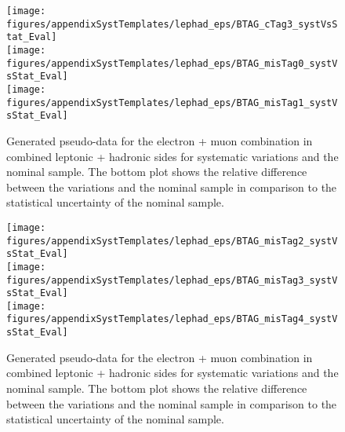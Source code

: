 \begin{figure}[!hb]
\begin{center}
        \texttt{[image: figures/appendixSystTemplates/lephad\_eps/BTAG\_cTag3\_systVsStat\_Eval]}\\
        \texttt{[image: figures/appendixSystTemplates/lephad\_eps/BTAG\_misTag0\_systVsStat\_Eval]}\\
        \texttt{[image: figures/appendixSystTemplates/lephad\_eps/BTAG\_misTag1\_systVsStat\_Eval]}
  
        \caption{Generated pseudo-data for the electron + muon combination in combined leptonic + hadronic sides for systematic variations and the nominal \ttbar sample. The bottom plot shows the relative difference between the variations and the nominal sample in comparison to the statistical uncertainty of the nominal sample.}   
        \label{fig:systematicVar_lephad_Btag_2_2}
        \end{center}                          
        \end{figure}

\begin{figure}[!hb]
\begin{center}
        \texttt{[image: figures/appendixSystTemplates/lephad\_eps/BTAG\_misTag2\_systVsStat\_Eval]}\\
        \texttt{[image: figures/appendixSystTemplates/lephad\_eps/BTAG\_misTag3\_systVsStat\_Eval]}\\
        \texttt{[image: figures/appendixSystTemplates/lephad\_eps/BTAG\_misTag4\_systVsStat\_Eval]}
  
        \caption{Generated pseudo-data for the electron + muon combination in combined leptonic + hadronic sides for systematic variations and the nominal \ttbar sample. The bottom plot shows the relative difference between the variations and the nominal sample in comparison to the statistical uncertainty of the nominal sample.}   
        \label{fig:systematicVar_lephad_Btag_3_1}
        \end{center}                          
        \end{figure}


